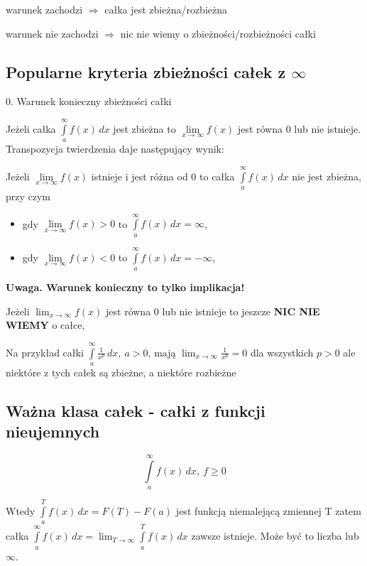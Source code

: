 \documentclass[12pt]{article}
\begin{document}
\quad warunek zachodzi $ \Rightarrow $ całka jest zbieżna/rozbieżna

\quad warunek nie zachodzi $ \Rightarrow $ nic nie wiemy o zbieżności/rozbieżności całki

\subsection*{Popularne kryteria zbieżności całek z $\infty$}

0. Warunek konieczny zbieżności całki

Jeżeli całka $ \int\limits_{a}^{\infty} f(x) \,dx $ jest zbieżna to 
$ \lim\limits_{x \to \infty} f(x) $ jest równa 0 lub nie istnieje. \\

Transpozycja twierdzenia daje następujący wynik:

Jeżeli $ \lim\limits_{x \to \infty} f(x) $ istnieje i jest różna od 0 to całka 
$ \int\limits_{a}^{\infty} f(x) \, dx $ nie jest zbieżna, przy czym

\begin{itemize}
    \item gdy $ \lim\limits_{x \to \infty} f(x) > 0 $ to $ \int\limits_{a}^{\infty} f(x) \,dx = \infty $,
    \item gdy $ \lim\limits_{x \to \infty} f(x) < 0 $ to $ \int\limits_{a}^{\infty} f(x) \,dx = -\infty $,
\end{itemize}

\textbf{Uwaga. Warunek konieczny to tylko implikacja!}

Jeżeli $ \lim_{x \to \infty} f(x) $ jest równa 0 lub nie istnieje to jeszcze \textbf{NIC NIE WIEMY} o całce,

Na przykład całki $ \int\limits_{a}^{\infty} \frac{1}{x^p} \,dx, \ a > 0 $, mają
$ \lim_{x \to \infty} \frac{1}{x^p} = 0 $ dla wszystkich $ p > 0 $ ale niektóre z tych całek są zbieżne,
a niektóre rozbieżne \\

\subsection*{Ważna klasa całek - całki z funkcji nieujemnych}

$$ \int\limits_{a}^{\infty} f(x) \,dx, \ f \geq 0 $$

Wtedy $ \int\limits_{a}^{T} f(x) \, dx = F(T) - F(a) $ jest funkcją niemalejącą zmiennej T zatem całka
$ \int\limits_{a}^{\infty} f(x) \, dx = \lim_{T \to \infty} \int\limits_{a}^{T} f(x) \,dx $
zawsze istnieje. Może być to liczba lub $\infty$.
\end{document}
